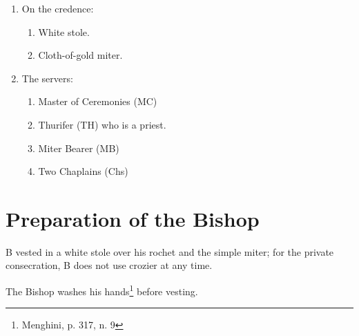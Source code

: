 \documentclass[letterpaper]{report}
\begin{document}
{\begin{enumerate}
\begin{enumerate}
	\end{enumerate}
	\item On the credence:
	\begin{enumerate}
		\item White stole.
		\item Cloth-of-gold miter.
	\end{enumerate}
	\item The servers:
	\begin{enumerate}
		\item Master of Ceremonies (MC)
		\item Thurifer (TH) who is a priest.
		\item Miter Bearer (MB)
		\item Two Chaplains (Chs)
	\end{enumerate}
\end{enumerate}
\section{Preparation of the Bishop}

B vested in a white stole over his rochet and the simple miter; for the private
consecration, B does not use crozier at any time.

The Bishop washes his hands\footnote{Menghini, p. 317, n. 9} before vesting.
}


\end{document}
